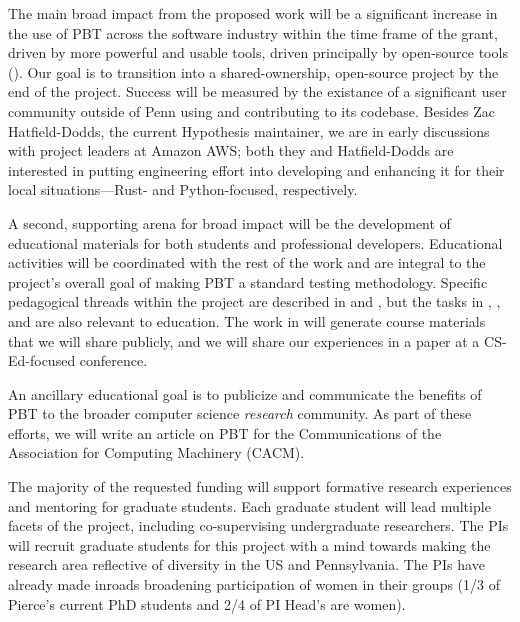 {\smallskip
{} The main broad impact from the
proposed work will be a significant increase in the use of PBT across
the software industry within the time frame of the grant, driven
by more powerful and usable tools, driven principally by open-source
tools (). Our goal is to
transition \tyche{} into a shared-ownership, open-source project
by the end of the project.
Success will be measured by the existance of a
significant user community outside of Penn using \tyche{} and
contributing to its codebase.  Besides Zac Hatfield-Dodds, the
current Hypothesis maintainer, we are in early discussions with
project leaders at Amazon AWS; both they and Hatfield-Dodds are
interested in putting engineering effort into developing \tyche{} and
enhancing it for their local
situations---Rust- and Python-focused, respectively.

\smallskip
{}
%
A second, supporting arena for broad impact will be the
development of educational materials for both students and
professional developers. Educational activities will be
coordinated with the rest of the work and are integral to the
project's overall goal of making PBT a standard testing methodology.
Specific pedagogical
threads within the project are described in  and , but the
tasks in
,
, and
 are also relevant to education. The
work in  will generate course materials that we will
share publicly, and we will share our experiences in a paper at a
CS-Ed-focused conference.

An ancillary educational goal is to
publicize and communicate the benefits of PBT to the broader computer science
{\em research} community. As part of these efforts, we will write an article on PBT
for the Communications of the Association for Computing Machinery
(CACM).

\smallskip
{}
%
The majority of the requested funding will support formative research
experiences and mentoring for graduate students. Each graduate
student will lead multiple facets of the
project, including co-supervising undergraduate
researchers.
%
The PIs will recruit graduate students for this project with a mind towards making
the research area reflective of diversity in the US and Pennsylvania.
The PIs have already made inroads broadening participation of women in their
groups (1/3 of Pierce's current PhD students and 2/4 of PI
Head's are women).

}
